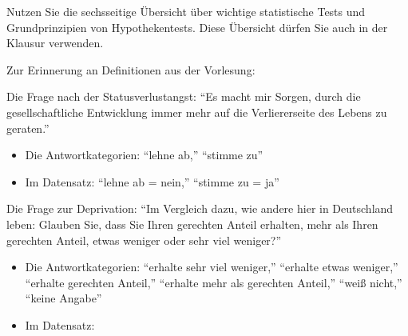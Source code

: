 \documentclass[11pt]{article}
\newcommand{\startwert}{3}
\newcommand{\aufgabe}[1]{\item{\bf #1}}
\begin{document}
\begin{enumerate}\addtocounter{enumi}{\startwert}


Nutzen Sie die sechsseitige Übersicht über wichtige statistische Tests und Grundprinzipien von Hypothekentests. Diese Übersicht dürfen Sie auch in der
Klausur verwenden.


Zur Erinnerung an Definitionen aus  der Vorlesung:

Die Frage nach der Statusverlustangst: ``Es macht mir Sorgen, durch die gesellschaftliche Entwicklung immer mehr auf die Verliererseite
 des Lebens zu geraten.''
 \begin{itemize}
   \item {Die Antwortkategorien: ``lehne ab,'' ``stimme zu''}
    \item {Im Datensatz: ``lehne ab = nein,'' ``stimme zu = ja''}
  \end{itemize} 
  Die Frage zur Deprivation: ``Im Vergleich dazu, wie andere hier in Deutschland leben: 
   Glauben Sie, dass Sie Ihren gerechten Anteil erhalten, 
   mehr als Ihren gerechten Anteil, etwas weniger oder sehr viel weniger?''
   \begin{itemize} 
   \item{Die Antwortkategorien: ``erhalte sehr viel weniger,'' ``erhalte etwas weniger,''  ``erhalte gerechten Anteil,''         
  ``erhalte mehr als gerechten Anteil,''  ``weiß nicht,'' ``keine Angabe''}
  \item{Im Datensatz:
    \begin{description}
    
     \item {
       \[
     \text{``erhalte weniger''}=\left\{\begin{array}{ll} \text{``erhalte sehr viel weniger,''} \\
         \text{``erhalte etwas weniger''}\end{array}\right. 
  \]
     }
      \item {
       \[
     \text{``erhalte genug''}=\left\{\begin{array}{ll} \text{``erhalte gerechten Anteil,''} \\
         \text{``erhalte mehr als gerechten Anteil''}\end{array}\right. 
  \]
     }
    

\end{description}}
\end{itemize}
\end{enumerate}
\end{document}
